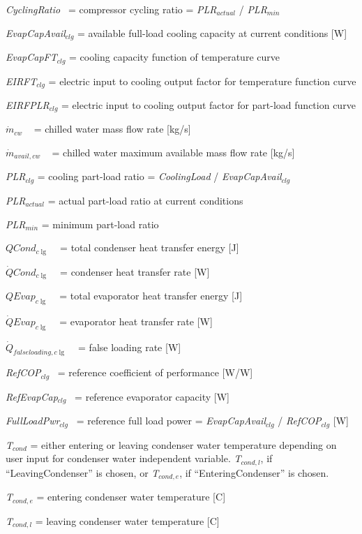 \emph{CyclingRatio}~ = compressor cycling ratio = \emph{PLR\(_{actual}\)} / \emph{PLR\(_{min}\)}

\emph{EvapCapAvail\(_{clg}\)} = available full-load cooling capacity at current conditions {[}W{]}

\emph{EvapCapFT\(_{clg}\)} = cooling capacity function of temperature curve

\emph{EIRFT\(_{clg}\)} = electric input to cooling output factor for temperature function curve

\emph{EIRFPLR\(_{clg}\)} = electric input to cooling output factor for part-load function curve

\({\dot m_{cw}}\) ~ = chilled water mass flow rate {[}kg/s{]}

\({\dot m_{avail,cw}}\) ~ = chilled water maximum available mass flow rate {[}kg/s{]}

\emph{PLR\(_{clg}\)} = cooling part-load ratio = \emph{CoolingLoad} / \emph{EvapCapAvail\(_{clg}\)}

\emph{PLR\(_{actual}\)} = actual part-load ratio at current conditions

\emph{PLR\(_{min}\)} = minimum part-load ratio

\(QCon{d_{c\lg }}\) ~ = total condenser heat transfer energy {[}J{]}

\(\dot QCon{d_{c\lg }}\) ~ = condenser heat transfer rate {[}W{]}

\(QEva{p_{c\lg }}\) ~ = total evaporator heat transfer energy {[}J{]}

\(\dot QEva{p_{c\lg }}\) ~ = evaporator heat transfer rate {[}W{]}

\({\dot Q_{falseloading,c\lg }}\) ~ = false loading rate {[}W{]}

\emph{RefCOP\(_{clg}\)}~ = reference coefficient of performance {[}W/W{]}

\emph{RefEvapCap\(_{clg}\)}~ = reference evaporator capacity {[}W{]}

\emph{FullLoadPwr\(_{clg}\)}~ = reference full load power = \emph{EvapCapAvail\(_{clg}\)} / \emph{RefCOP\(_{clg}\)} {[}W{]}

\emph{T\(_{cond}\)} = either entering or leaving condenser water temperature depending on user input for condenser water independent variable. \emph{T\(_{cond,l}\)}, if ``LeavingCondenser'' is chosen, or \emph{T\(_{cond,e}\)}, if ``EnteringCondenser'' is chosen.

\emph{T\(_{cond,e}\)} = entering condenser water temperature {[}C{]}

\emph{T\(_{cond,l}\)} = leaving condenser water temperature {[}C{]}

